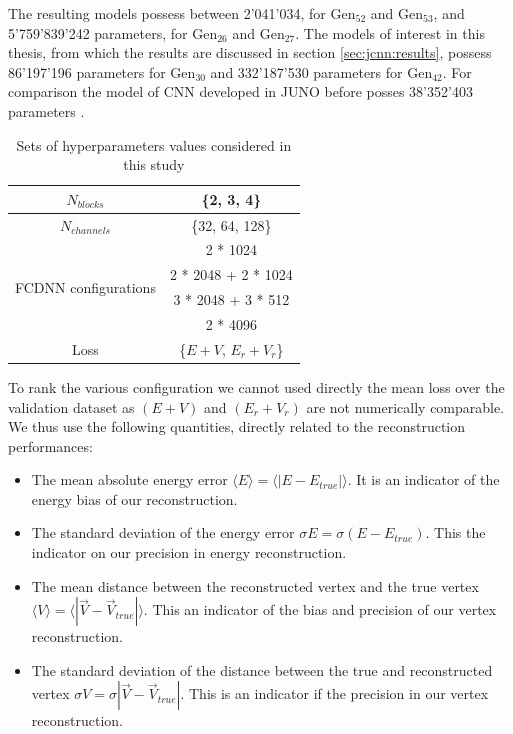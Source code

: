 \documentclass[../main.tex]{subfiles}
\begin{document}
\hfill

The resulting models possess between 2'041'034, for $\mathrm{Gen}_{52}$ and $\mathrm{Gen}_{53}$, and  5'759'839'242 parameters, for $\mathrm{Gen}_{26}$ and $\mathrm{Gen}_{27}$. The models of interest in this thesis, from which the results are discussed in section \ref{sec:jcnn:results}, possess 86'197'196 parameters for $\mathrm{Gen}_{30}$ and 332'187'530 parameters for $\mathrm{Gen}_{42}$. For comparison the model of CNN developed in JUNO before posses 38'352'403 parameters \cite{qian_vertex_2021}.

\begin{table}[ht]
  \centering
  \begin{tabular}{ | c | c | }
    \hline $N_{blocks}$ & \{2, 3, 4\} \\
    \hline $N_{channels}$ & \{32, 64, 128\} \\
    \hline
    \multirow{4}{*}{FCDNN configurations} & 2 * 1024 \\
                                        & 2 * 2048 + 2 * 1024 \\
                                        & 3 * 2048 + 3 * 512 \\
                                        & 2 * 4096 \\
    \hline
    Loss & \{$E+V$, $E_r + V_r$\} \\
    \hline
  \end{tabular}
  \caption{Sets of hyperparameters values considered in this study}
  \label{tab:jcnn:hyper}
\end{table}


To rank the various configuration we cannot used directly the mean loss over the validation dataset as $(E+V)$ and $(E_r + V_r)$ are not numerically comparable. We thus use the following quantities, directly related to the reconstruction performances:
\begin{itemize}
  \item The mean absolute energy error $\langle E \rangle = \langle | E - E_{true} | \rangle$. It is an indicator of the energy bias of our reconstruction.
  \item The standard deviation of the energy error $\sigma E = \sigma (E - E_{true})$. This the indicator on our precision in energy reconstruction.
  \item The mean distance between the reconstructed vertex and the true vertex $\langle V \rangle = \langle | \vec{V} - \vec{V}_{true} | \rangle$. This an indicator of the bias and precision of our vertex reconstruction.
  \item The standard deviation of the distance between the true and reconstructed vertex $\sigma V = \sigma |\vec{V} - \vec{V}_{true}|$. This is an indicator if the precision in our vertex reconstruction.
\end{itemize}
\end{document}
